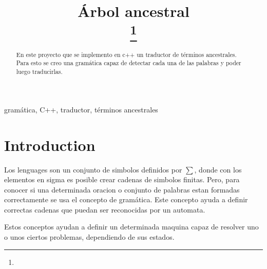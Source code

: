 \documentclass[conference]{IEEEtran}
\begin{document}
\title{\'Arbol ancestral \\
{\footnotesize \textsuperscript{}}
\thanks{}
}

\author{
\and
{}
\and
{}
}

\maketitle

\begin{abstract}
En este proyecto que se implemento en c++ un traductor de t\'erminos ancestrales. Para esto se creo una gram\'atica capaz de detectar cada una de las palabras y poder luego traducirlas. 

\end{abstract}

\begin{IEEEkeywords}
gram\'atica, C++, traductor, t\'erminos ancestrales 
\end{IEEEkeywords}

\section{Introduction}
Los lenguages son un conjunto de simbolos definidos por $\sum$, 
donde con los elementos en sigma es posible crear cadenas de simbolos finitas. Pero, para conocer si una determinada oracion o conjunto de palabras estan formadas correctamente se usa el concepto de gram\'atica. Este concepto ayuda a definir correctas cadenas que puedan ser reconocidas por un automata. 

Estos conceptos ayudan a definir un determinada maquina capaz de resolver uno o unos ciertos problemas, dependiendo de sus estados.
\end{document}
